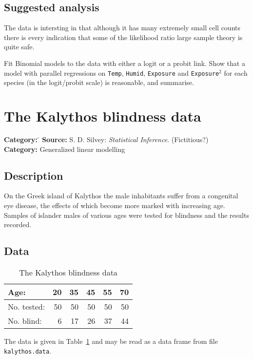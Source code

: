 \documentclass{article}
\newcommand{\strutt}{\vrule height 2.5ex depth 0.5ex width 0ex}%
\newcommand{\code}[1]{\texttt{#1}}
\begin{document}
\subsection*{Suggested analysis}
The data is intersting in that although it has many extremely small cell
counts there is every indication that some of the likelihood ratio large
sample theory is quite safe.

Fit Binomial models to the data with either a logit or a probit link.  Show
that a model with parallel regressions on \code{Temp}, \code{Humid},
\texttt{Exposure} and \code{Exposure}$^2$ for each species (in the logit/probit
scale) is reasonable, and summarise.

\clearpage\section{The Kalythos blindness data}
\begin{tabbing}
\textbf{Category:} \= \kill
\textbf{Source:} \> S. D. Silvey: \textsl{Statistical Inference}.  (Fictitious?)\\
\textbf{Category:} \> Generalized linear modelling
\end{tabbing}

\subsection*{Description}
On the Greek island of Kalythos the male inhabitants suffer from a
congenital eye disease, the effects of which become more marked with
increasing age.  Samples of islander males of various ages  were tested for
blindness and the results recorded.

\subsection*{Data}

\begin{table}[ht]
\begin{center}
\begin{tabular}{@{\protect\strutt}|l|rrrrr|}
\hline
Age:        &  20 &  35 &  45 &  55 &  70 \\
\hline
No. tested: &  50 &  50 &  50 &  50 &  50 \\
\hline
No. blind:  &   6 &  17 &  26 &  37 &  44 \\
\hline
\end{tabular}
\end{center}

\caption{\label{kalythos}The Kalythos blindness data}
\end{table}
The data is given in Table~\ref{kalythos} and may be read as a data frame from
file \code{kalythos.data}.
\end{document}
